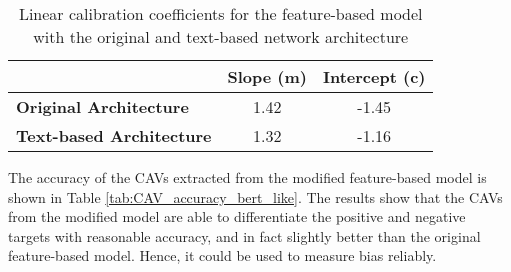 \begin{table}[H]
    \centering
    \begin{tabular}{|l|c|c|}
        \hline
        \textbf{}                        & \textbf{Slope (m)} & \textbf{Intercept (c)} \\ \hline
        \textbf{Original Architecture}   & 1.42               & -1.45                  \\ \hline
        \textbf{Text-based Architecture} & 1.32               & -1.16                  \\ \hline
    \end{tabular}
    \caption{Linear calibration coefficients for the feature-based model with the original and text-based network architecture}
    \label{tab:linear_regression_coefficients_bert_like}
\end{table}

The accuracy of the CAVs extracted from the modified feature-based model is shown in Table \ref{tab:CAV_accuracy_bert_like}. The results show that the CAVs from the modified model are able to differentiate the positive and negative targets with reasonable accuracy, and in fact slightly better than the original feature-based model. Hence, it could be used to measure bias reliably.

